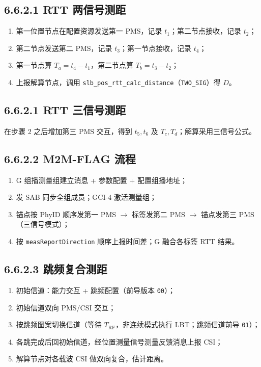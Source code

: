 \documentclass[11pt,a4paper]{ctexart}
\begin{document}
\subsection{6.6.2.1 RTT 两信号测距}

\begin{enumerate}
  \item 第一位置节点在配置资源发送第一 PMS，记录 $t_1$；第二节点接收，记录 $t_2$；
  \item 第二节点发送第二 PMS，记录 $t_3$；第一节点接收，记录 $t_4$；
  \item 第一节点算 $T_a=t_4-t_1$，第二节点算 $T_b=t_3-t_2$；
  \item 上报解算节点，调用 \texttt{slb\_pos\_rtt\_calc\_distance}（\texttt{TWO\_SIG}）得 $D$。
\end{enumerate}

\subsection{6.6.2.1 RTT 三信号测距}

在步骤 2 之后增加第三 PMS 交互，得到 $t_5,t_6$ 及 $T_c,T_d$；解算采用三信号公式。

\subsection{6.6.2.2 M2M-FLAG 流程}

\begin{enumerate}
  \item G 组播测量组建立消息 + 参数配置 + 配置组播地址；
  \item 发 SAB 同步全组成员；GCI-4 激活测量组；
  \item 锚点按 PhyID 顺序发第一 PMS $\rightarrow$ 标签发第二 PMS $\rightarrow$ 锚点发第三 PMS（三信号模式）；
  \item 按 \texttt{measReportDirection} 顺序上报时间差；G 融合各标签 RTT 结果。
\end{enumerate}

\subsection{6.6.2.3 跳频复合测距}

\begin{enumerate}
  \item 初始信道：能力交互 + 跳频配置（前导版本 \texttt{00}）；
  \item 初始信道双向 PMS/CSI 交互；
  \item 按跳频图案切换信道（等待 $T_{\mathrm{RF}}$，非连续模式执行 LBT；跳频信道前导 \texttt{01}）；
  \item 各跳完成后回初始信道，经位置测量信号测量反馈消息上报 CSI；
  \item 解算节点对各载波 CSI 做双向复合，估计距离。
\end{enumerate}
\end{document}
